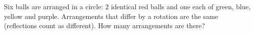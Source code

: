 Six balls are arranged in a circle: $2$ identical red balls and one each of green, blue, yellow and purple. Arrangements that differ by a rotation are the same (reflections count as different). How many arrangements are there?
